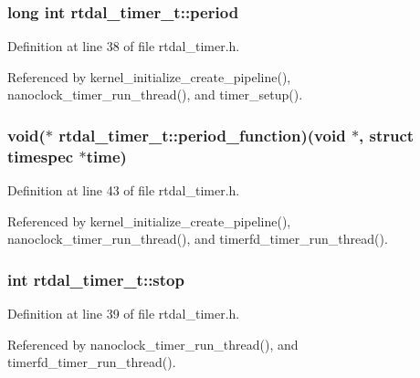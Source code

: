 \subsubsection[{period}]{\setlength{\rightskip}{0pt plus 5cm}long int rtdal\-\_\-timer\-\_\-t\-::period}\label{structrtdal__timer__t_a289e83fa067430617d384467265df41e}


Definition at line 38 of file rtdal\-\_\-timer.\-h.



Referenced by kernel\-\_\-initialize\-\_\-create\-\_\-pipeline(), nanoclock\-\_\-timer\-\_\-run\-\_\-thread(), and timer\-\_\-setup().

\subsubsection[{period\-\_\-function}]{\setlength{\rightskip}{0pt plus 5cm}void($\ast$ rtdal\-\_\-timer\-\_\-t\-::period\-\_\-function)(void $\ast$, struct timespec $\ast$time)}\label{structrtdal__timer__t_a9e202cbf4ae2d7a24c3e956d9dd0cc48}


Definition at line 43 of file rtdal\-\_\-timer.\-h.



Referenced by kernel\-\_\-initialize\-\_\-create\-\_\-pipeline(), nanoclock\-\_\-timer\-\_\-run\-\_\-thread(), and timerfd\-\_\-timer\-\_\-run\-\_\-thread().

\subsubsection[{stop}]{\setlength{\rightskip}{0pt plus 5cm}int rtdal\-\_\-timer\-\_\-t\-::stop}\label{structrtdal__timer__t_a760c332c00e1eebe04e98f6b238932b5}


Definition at line 39 of file rtdal\-\_\-timer.\-h.



Referenced by nanoclock\-\_\-timer\-\_\-run\-\_\-thread(), and timerfd\-\_\-timer\-\_\-run\-\_\-thread().

